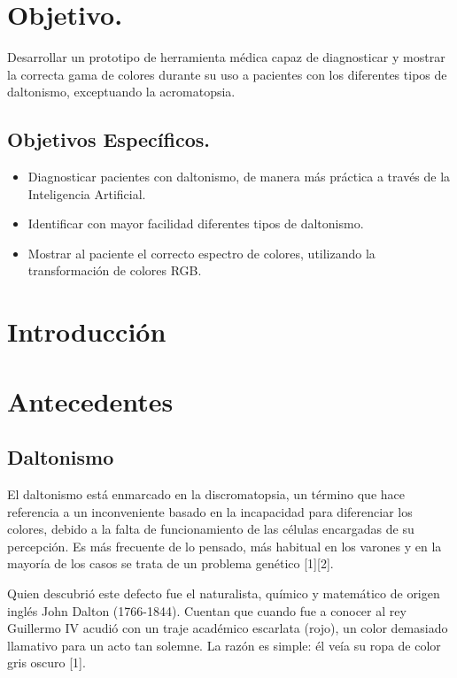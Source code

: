 \documentclass[10pt]{article}
\begin{document}
\section{Objetivo.}

Desarrollar un prototipo de herramienta médica capaz de diagnosticar y mostrar la correcta gama de colores durante su uso  a pacientes con los diferentes tipos de daltonismo, exceptuando la acromatopsia. 

\subsection{Objetivos Específicos.}
\begin{itemize}
\item Diagnosticar pacientes con daltonismo, de manera más práctica a través de la Inteligencia Artificial.
 \item Identificar con mayor facilidad diferentes tipos de daltonismo.
\item Mostrar al paciente el correcto espectro de colores, utilizando la transformación de colores RGB.
\end{itemize}


\newpage

\section{Introducción}

\section{Antecedentes}
\subsection{Daltonismo}
El daltonismo está enmarcado en la discromatopsia, un término que hace referencia a un inconveniente basado en la incapacidad para diferenciar los colores, debido a la falta de funcionamiento de las células encargadas de su percepción. Es más frecuente de lo pensado, más habitual en los varones y en la mayoría de los casos se trata de un problema genético [1][2].

\setlength{\parskip}{2mm}

Quien descubrió este defecto fue el naturalista, químico y matemático de origen inglés John Dalton (1766-1844).
Cuentan que cuando fue a conocer al rey Guillermo IV acudió con un traje académico escarlata (rojo), un color demasiado llamativo para un acto tan solemne. La razón es simple: él veía su ropa de color gris oscuro [1].
\end{document}
